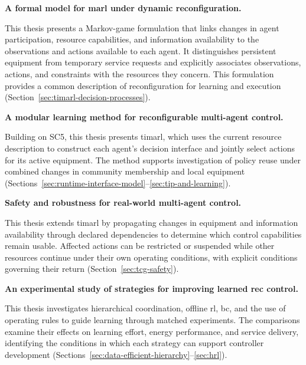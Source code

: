\begin{description}[leftmargin=3.6em,labelwidth=3em,labelsep=0.6em,align=left,font=\normalfont\bfseries,itemsep=0.55\baselineskip,parsep=0pt,topsep=0.5\baselineskip]
\item[SC5] \textbf{A formal model for \gls{marl} under dynamic reconfiguration.}\par\nobreak
This thesis presents a Markov-game formulation that links changes in agent participation, resource capabilities, and information availability to the observations and actions available to each agent. It distinguishes persistent equipment from temporary service requests and explicitly associates observations, actions, and constraints with the resources they concern. This formulation provides a common description of reconfiguration for learning and execution (Section~\ref{sec:timarl-decision-processes}).

\item[SC6] \textbf{A modular learning method for reconfigurable multi-agent control.}\par\nobreak
Building on SC5, this thesis presents \gls{timarl}, which uses the current resource description to construct each agent's decision interface and jointly select actions for its active equipment. The method supports investigation of policy reuse under combined changes in community membership and local equipment (Sections~\ref{sec:runtime-interface-model}--\ref{sec:tip-and-learning}).

\item[SC7] \textbf{Safety and robustness for real-world multi-agent control.}\par\nobreak
This thesis extends \gls{timarl} by propagating changes in equipment and information availability through declared dependencies to determine which control capabilities remain usable. Affected actions can be restricted or suspended while other resources continue under their own operating conditions, with explicit conditions governing their return (Section~\ref{sec:tcg-safety}).

\item[SC8] \textbf{An experimental study of strategies for improving learned \gls{rec} control.}\par\nobreak
This thesis investigates hierarchical coordination, offline \gls{rl}, \gls{bc}, and the use of operating rules to guide learning through matched experiments. The comparisons examine their effects on learning effort, energy performance, and service delivery, identifying the conditions in which each strategy can support controller development (Sections~\ref{sec:data-efficient-hierarchy}--\ref{sec:hrl}).


\end{description}
